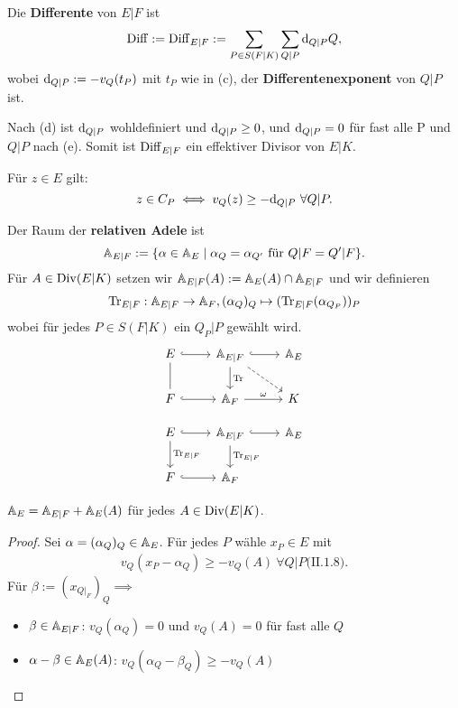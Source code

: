 \begin{definition}
    Die \textbf{Differente} von $E|F$ ist
    $$ \operatorname{Diff} := \operatorname{Diff}_{E|F} := \sum_{P\in S(F|K)}\sum_{Q|P}\mathrm{d}_{Q|P}Q,$$
    wobei $\mathrm{d}_{Q|P}:= -v_Q(t_P)$ mit $t_P$ wie in (c), der \textbf{Differentenexponent} von $Q|P$ ist.
\end{definition}

\begin{bemerkungnr}
    Nach (d) ist $\mathrm{d}_{Q|P}$ wohldefiniert und $\mathrm{d}_{Q|P} \geq 0$, und $\mathrm{d}_{Q|P} = 0$ für fast alle P und $Q|P$ nach (e).
    Somit ist $\operatorname{Diff}_{E|F}$ ein effektiver Divisor von $E|K$.
\end{bemerkungnr}

\begin{bemerkungnr}
    Für $z \in E$ gilt:
    $$ z \in C_P \iff v_Q(z) \geq - \mathrm{d}_{Q|P} ~\forall Q|P.$$
\end{bemerkungnr}

\begin{definition}
    Der Raum der \textbf{relativen Adele} ist
    $$ \mathbb{A}_{E|F} := \{\alpha \in \mathbb{A}_E \mid \alpha_Q = \alpha_{Q'} \text{ für } Q|F = Q'|F\}.$$
    Für $A \in \operatorname{Div}(E|K)$ setzen wir $\mathbb{A}_{E|F}(A) := \mathbb{A}_E(A) \cap \mathbb{A}_{E|F}$ und wir definieren
    $$ \operatorname{Tr}_{E|F} : \mathbb{A}_{E|F} \to \mathbb{A}_F, (\alpha_Q)_Q \mapsto (\operatorname{Tr}_{E|F}(\alpha_{Q_P}))_P$$
    wobei für jedes $P \in S(F|K)$ ein $Q_P|P$ gewählt wird.
    $$\begin{tikzcd}
      E \rar[hook] & \A_{E|F} \drar[dashed] \dar{\Tr} \rar[hook] & \A_E \\
      F \rar[hook] \uar[dash] & \A_F \rar{\omega} & K  
    \end{tikzcd}$$
\end{definition}

\begin{bemerkungnr}
    $$\begin{tikzcd}
        E \rar[hook] \dar{\Tr_{E|F}}& \A_{E|F} \dar{\Tr_{E|F}} \rar[hook] & \A_E\\
        F \rar[hook] & \A_F
    \end{tikzcd}$$
\end{bemerkungnr}
    
\begin{lemma}
    $\mathbb{A}_E = \mathbb{A}_{E|F} + \mathbb{A}_E(A)$ für jedes $A \in \operatorname{Div}(E|K)$.
\end{lemma}
\begin{proof}
    Sei $\alpha=(\alpha_Q)_Q \in \mathbb{A}_E$. Für jedes $P$ wähle $x_P \in E$ mit
    \begin{align*}
        v_Q(x_P - \alpha_Q) \geq - v_Q(A) ~\forall Q|P \text{(II.1.8)}.
    \end{align*}
    Für $\beta := (x_{Q|_F})_Q \implies$
    \begin{itemize}
        \item $\beta \in \mathbb{A}_{E|F}$: $v_Q(\alpha_Q)=0$ und $v_Q(A)=0$ für fast alle $Q$
        \item $\alpha - \beta \in \mathbb{A}_E(A)$: $v_Q(\alpha_Q -\beta_Q) \geq -v_Q(A)$
    \end{itemize}
\end{proof}

